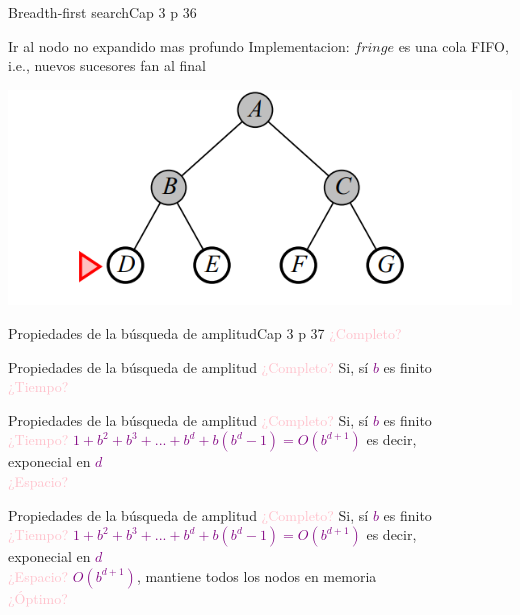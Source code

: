 \documentclass{beamer}
\theoremstyle{definition}
\theoremstyle{theorem}
\theoremstyle{remark}
\begin{document}
\begin{frame}{Breadth-first search}{Cap 3 p 36}
\begin{right}

Ir al nodo no expandido mas profundo
Implementacion:
$fringe$ es una cola FIFO, i.e., nuevos sucesores fan al final

\includegraphics[scale = 0.5]{tree_bfs_p36.PNG}

\end{right}
\end{frame}

    \begin{frame}{Propiedades de la búsqueda de amplitud}{Cap 3 p 37}
        \textcolor{Pink}{¿Completo?}
    \end{frame}

\begin{frame}{Propiedades de la búsqueda de amplitud}
    \textcolor{Pink}{¿Completo?} Si, sí \textcolor{Purple}{$b$} es finito \\
    \textcolor{Pink}{¿Tiempo?}
\end{frame}

\begin{frame}{Propiedades de la búsqueda de amplitud}
    \textcolor{Pink}{¿Completo?} Si, sí \textcolor{Purple}{$b$} es finito \\
    \textcolor{Pink}{¿Tiempo?} \textcolor{Purple}{$1+b^2+b^3+...+b^d+b(b^d-1)=O(b^{d+1})$} es decir,\\    \hspace{9.3cm} exponecial en \textcolor{Purple}{$d$} \\
    \textcolor{Pink}{¿Espacio?} \\
\end{frame}

\begin{frame}{Propiedades de la búsqueda de amplitud}
    \textcolor{Pink}{¿Completo?} Si, sí \textcolor{Purple}{$b$} es finito \\
    \textcolor{Pink}{¿Tiempo?} \textcolor{Purple}{$1+b^2+b^3+...+b^d+b(b^d-1)=O(b^{d+1})$} es decir,\\    \hspace{9.3cm} exponecial en \textcolor{Purple}{$d$} \\
    \textcolor{Pink}{¿Espacio?} \textcolor{Purple}{$O(b^{d+1})$}, mantiene todos los nodos en memoria \\
    \textcolor{Pink}{¿Óptimo?}
\end{frame}
\end{document}
